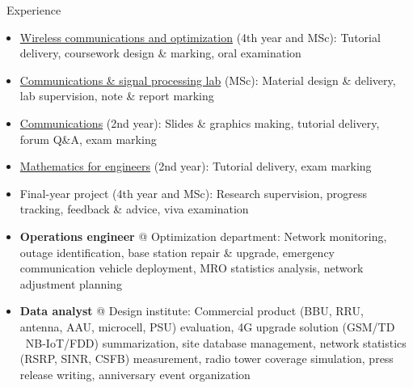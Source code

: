 \documentclass{cv}
\begin{document}
\begin{section}{\faUsers\ Experience}
	\begin{itemize}[rightmargin=60pt]
		\item \href{https://github.com/snowztail/imperial/blob/master/EE4%20-%2065%20Wireless%20Communications/Lecture%20Notes/slides_2023.pdf}{Wireless communications and optimization} (4th year and MSc): Tutorial delivery, coursework design \& marking, oral examination
		\item \href{https://github.com/snowztail/imperial/tree/master/EE9%20-%20SLAB%20Communications%20and%20Signal%20Processing%20Laboratory}{Communications \& signal processing lab} (MSc): Material design \& delivery, lab supervision, note \& report marking
		\item \href{https://github.com/snowztail/imperial/blob/master/EE2%20-%2002%20Communications/Lecture%20Notes/lecture_all.pdf}{Communications} (2nd year): Slides \& graphics making, tutorial delivery, forum Q\&A, exam marking
		\item \href{https://github.com/snowztail/imperial/blob/master/EE2%20-%2011%20Mathematics%20for%20Engineers/Lecture%20Notes/ME%20-%20Full%20Set.pdf}{Mathematics for engineers} (2nd year): Tutorial delivery, exam marking
		\item Final-year project (4th year and MSc): Research supervision, progress tracking, feedback \& advice, viva examination
	\end{itemize}

	\begin{itemize}[rightmargin=60pt]
		\item \textbf{Operations engineer} @ Optimization department: Network monitoring, outage identification, base station repair \& upgrade, emergency communication vehicle deployment, MRO statistics analysis, network adjustment planning
		\item \textbf{Data analyst} @ Design institute: Commercial product (BBU, RRU, antenna, AAU, microcell, PSU) evaluation, 4G upgrade solution (GSM/TD \textrightarrow\ NB-IoT/FDD) summarization, site database management, network statistics (RSRP, SINR, CSFB) measurement, radio tower coverage simulation, press release writing, anniversary event organization
	\end{itemize}
\end{section}

\vspace{-1em}
\end{document}
